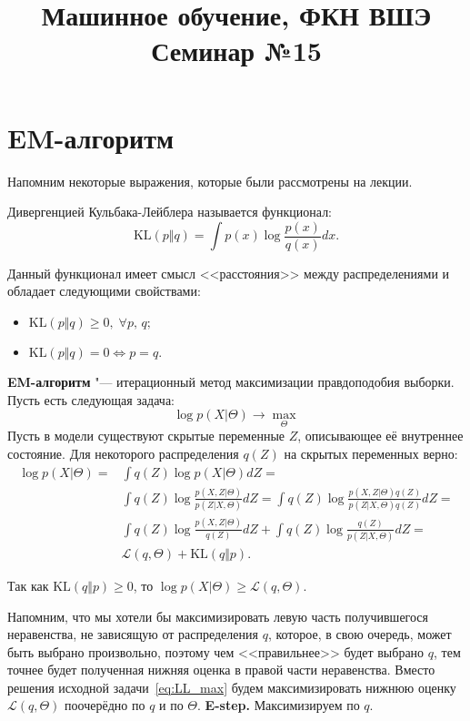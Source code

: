 \documentclass[12pt,a4paper]{article}
\title{Машинное обучение, ФКН ВШЭ\\Семинар №15}
\author{}
\date{}
\begin{document}
\maketitle
\section{EM-алгоритм}
Напомним некоторые выражения, которые были рассмотрены на лекции.

Дивергенцией Кульбака-Лейблера называется функционал:
\begin{equation}
\text{KL}(p\Vert q) = \int p(x)\log \frac{p(x)}{q(x)} dx.
\end{equation}

Данный функционал имеет смысл <<расстояния>> между распределениями и обладает следующими свойствами:
\begin{itemize}
	\item $\text{KL}(p\Vert q) \geq 0, \; \forall p, \,q;$
	\item $\text{KL}(p\Vert q) = 0  \iff p=q.$
\end{itemize}

\textbf{EM-алгоритм} "--- итерационный метод максимизации правдоподобия выборки. Пусть есть следующая задача:
\begin{equation} \label{eq:LL_max}
	\log p(X\vert \Theta) \rightarrow \max_{\Theta}
\end{equation}
Пусть в модели существуют скрытые переменные $Z$, описывающее её внутреннее состояние. Для некоторого распределения $q(Z)$ на скрытых переменных верно:
\begin{align*}
	\log p(X\vert \Theta) = &\int q(Z) \log p(X\vert \Theta) dZ =\\
	 &\int q(Z) \log \frac{p(X,Z\vert \Theta)}{p(Z\vert X, \Theta)} dZ =  \int q(Z) \log \frac{p(X,Z\vert \Theta)q(Z)}{p(Z\vert X, \Theta)q(Z)} dZ = \\
	&\int q(Z)\log \frac{p(X,Z\vert \Theta)}{q(Z)} dZ +\int q(Z) \log \frac{q(Z)}{p(Z\vert X, \Theta)} dZ =\\ & \mathcal{L}(q,\Theta) + \text{KL}(q\Vert p).
\end{align*}

Так как $\text{KL}(q\Vert p) \geq 0$, то $\log p(X\vert \Theta) \geq \mathcal{L}(q,\Theta)$.

Напомним, что мы хотели бы максимизировать левую часть получившегося неравенства, не зависящую от распределения $q$, которое, в свою очередь, может быть выбрано произвольно, поэтому чем <<правильнее>> будет выбрано $q$, тем точнее будет полученная нижняя оценка в правой части неравенства. Вместо решения исходной задачи~\ref{eq:LL_max} будем максимизировать нижнюю оценку $\mathcal{L}(q,\Theta)$ поочерёдно по $q$ и по $\Theta$.
\newpage
\textbf{E-step.} Максимизируем по $q$.
\end{document}
